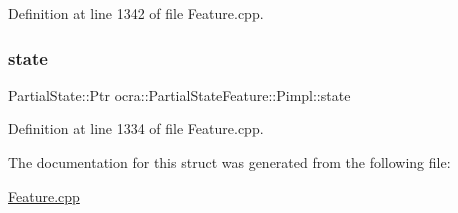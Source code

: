 Definition at line 1342 of file Feature.\+cpp.

\hypertarget{structocra_1_1PartialStateFeature_1_1Pimpl_a780cc4ecc5de8f231684ffdd394aa31a}{}\label{structocra_1_1PartialStateFeature_1_1Pimpl_a780cc4ecc5de8f231684ffdd394aa31a} 
\subsubsection{\texorpdfstring{state}{state}}
{\footnotesize\ttfamily Partial\+State\+::\+Ptr ocra\+::\+Partial\+State\+Feature\+::\+Pimpl\+::state}



Definition at line 1334 of file Feature.\+cpp.



The documentation for this struct was generated from the following file\+:\begin{DoxyCompactItemize}
\item 
\hyperlink{Feature_8cpp}{Feature.\+cpp}\end{DoxyCompactItemize}
